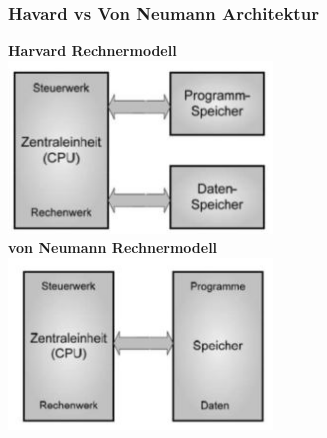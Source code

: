 \subsubsection{Havard vs Von Neumann Architektur}
\begin{multicols}{2}
    \textbf{Harvard Rechnermodell}\\
    \includegraphics[width=7cm]{images/HavardArchi}
    \\	
    \textbf{von Neumann Rechnermodell}\\
    \includegraphics[width=7cm]{images/NeumannArchi}
\end{multicols}

